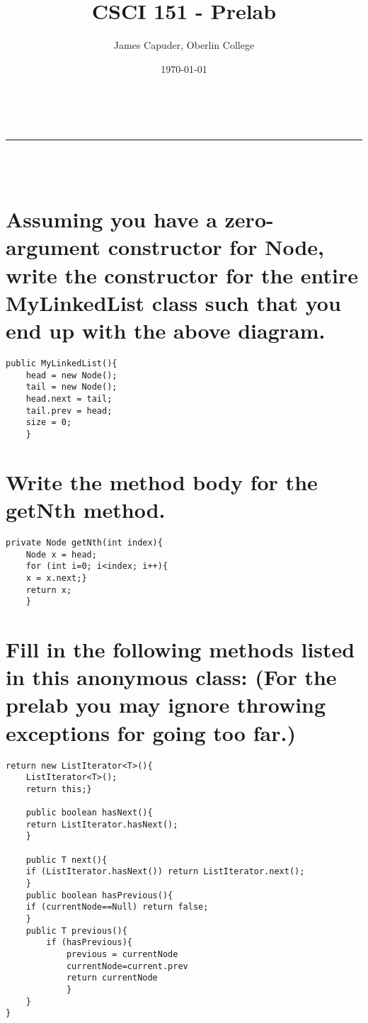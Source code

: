 \documentclass[a4paper,11pt]{article}
\makeatletter
\newcommand{\linia}{\rule{\linewidth}{0.5pt}}
\theoremstyle{mytheor}
\renewcommand{\maketitle}{
\begin{center}
\vspace{2ex}
{\huge \textsc{\@title}}
\vspace{1ex}
\\
\linia\\
\@author \hfill \@date\
\vspace{4ex}
\end{center}
}
\makeatother
\begin{document}
\title{CSCI 151 - Prelab }

\author{James Capuder, Oberlin College}

\date{\today}

\maketitle

\section{Assuming you have a zero-argument constructor for Node, write the constructor for the entire MyLinkedList class such that you end up with the above diagram.}

\begin{verbatim}
public MyLinkedList(){
    head = new Node();
    tail = new Node();
    head.next = tail;
    tail.prev = head;
    size = 0;
    }
\end{verbatim}

\section{Write the method body for the getNth method.}
\begin{verbatim}
private Node getNth(int index){
    Node x = head;
    for (int i=0; i<index; i++){
    x = x.next;}
    return x;
    }
\end{verbatim}


\section{Fill in the following methods listed in this anonymous class: (For the prelab you may ignore throwing exceptions for going too far.)}
\begin{verbatim}
return new ListIterator<T>(){
    ListIterator<T>();
    return this;}
    
    public boolean hasNext(){
    return ListIterator.hasNext();
    }
    
    public T next(){
    if (ListIterator.hasNext()) return ListIterator.next();
    }
    public boolean hasPrevious(){
    if (currentNode==Null) return false;
    }
    public T previous(){
        if (hasPrevious){
            previous = currentNode
            currentNode=current.prev
            return currentNode
            }
    }
}
\end{verbatim}
\end{document}
